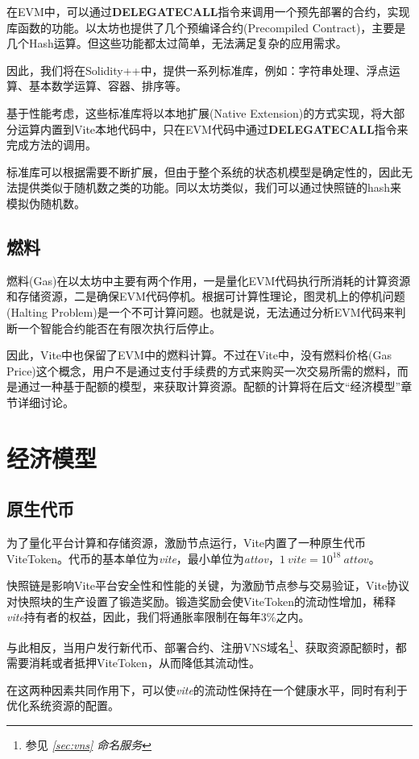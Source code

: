 \documentclass[UTF8,nofonts]{ctexart}
\begin{document}
\begin{multicols}{2}
在EVM中，可以通过\textbf{DELEGATECALL}指令来调用一个预先部署的合约，实现库函数的功能。以太坊也提供了几个预编译合约(Precompiled Contract)，主要是几个Hash运算。但这些功能都太过简单，无法满足复杂的应用需求。

因此，我们将在Solidity++中，提供一系列标准库，例如：字符串处理、浮点运算、基本数学运算、容器、排序等。

基于性能考虑，这些标准库将以本地扩展(Native Extension)的方式实现，将大部分运算内置到Vite本地代码中，只在EVM代码中通过\textbf{DELEGATECALL}指令来完成方法的调用。

标准库可以根据需要不断扩展，但由于整个系统的状态机模型是确定性的，因此无法提供类似于随机数之类的功能。同以太坊类似，我们可以通过快照链的hash来模拟伪随机数。

\subsection{燃料}
燃料(Gas)在以太坊中主要有两个作用，一是量化EVM代码执行所消耗的计算资源和存储资源，二是确保EVM代码停机。根据可计算性理论，图灵机上的停机问题(Halting Problem)是一个不可计算问题\cite{haltingproblems}。也就是说，无法通过分析EVM代码来判断一个智能合约能否在有限次执行后停止。

因此，Vite中也保留了EVM中的燃料计算。不过在Vite中，没有燃料价格(Gas Price)这个概念，用户不是通过支付手续费的方式来购买一次交易所需的燃料，而是通过一种基于配额的模型，来获取计算资源。配额的计算将在后文“经济模型”章节详细讨论。

\section{经济模型}
\subsection{原生代币}
为了量化平台计算和存储资源，激励节点运行，Vite内置了一种原生代币ViteToken。代币的基本单位为\textit{vite}，最小单位为\textit{attov}，$1 \: vite = 10^{18} \: attov$。

快照链是影响Vite平台安全性和性能的关键，为激励节点参与交易验证，Vite协议对快照块的生产设置了锻造奖励。锻造奖励会使ViteToken的流动性增加，稀释\textit{vite}持有者的权益，因此，我们将通胀率限制在每年3\%之内。

与此相反，当用户发行新代币、部署合约、注册VNS域名\footnote{参见  \textit{\ref{sec:vns} 命名服务}}、获取资源配额时，都需要消耗或者抵押ViteToken，从而降低其流动性。

在这两种因素共同作用下，可以使\textit{vite}的流动性保持在一个健康水平，同时有利于优化系统资源的配置。


\end{multicols}
\end{document}
